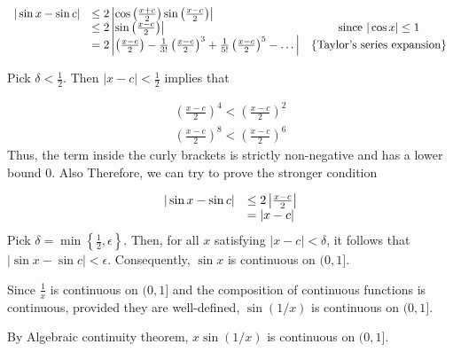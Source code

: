 \documentclass[10pt]{article}
\begin{document}
\begin{equation*}
\begin{array}{ c l c }
|\sin x-\sin c| & \leq 2\left| \cos\left(\frac{x+c}{2}\right)\sin\left(\frac{x-c}{2}\right)\right|  & \\
 & \leq 2\left| \sin\left(\frac{x-c}{2}\right)\right|  & \text{since } |\cos x|\leq 1\\
 & =2\left| \left(\frac{x-c}{2}\right) -\frac{1}{3!}\left(\frac{x-c}{2}\right)^{3} +\frac{1}{5!}\left(\frac{x-c}{2}\right)^{5} -\dotsc \right|  & \left\{\text{Taylor's series 

expansion}\right\}
\end{array}
\end{equation*}




Pick $\displaystyle \delta < \frac{1}{2}$. Then $\displaystyle |x-c|< \frac{1}{2}$ implies that 


\begin{gather*}
\left(\frac{x-c}{2}\right)^{4} < \left(\frac{x-c}{2}\right)^{2}\\
\left(\frac{x-c}{2}\right)^{8} < \left(\frac{x-c}{2}\right)^{6}
\end{gather*}
Thus, the term inside the curly brackets is strictly non-negative and has a lower bound $\displaystyle 0$. Also Therefore, we can try to prove the stronger condition


\begin{equation*}
\begin{array}{ c l }
|\sin x-\sin c| & \leq 2\left| \frac{x-c}{2}\right| \\
 & =|x-c|
\end{array}
\end{equation*}
Pick $\displaystyle \delta =\min\left\{\frac{1}{2} ,\epsilon \right\}$. Then, for all $\displaystyle x$ satisfying $\displaystyle |x-c|< \delta $, it follows that $\displaystyle |\sin x-\sin c|< \epsilon $. Consequently, $\displaystyle \sin x$ is continuous on $\displaystyle ( 0,1]$.



Since $\displaystyle \frac{1}{x}$ is continuous on $\displaystyle ( 0,1]$ and the composition of continuous functions is continuous, provided they are well-defined, $\displaystyle \sin( 1/x)$ is continuous on $\displaystyle ( 0,1]$.



By Algebraic continuity theorem, $\displaystyle x\sin( 1/x)$ is continuous on $\displaystyle ( 0,1]$. 
\end{document}
